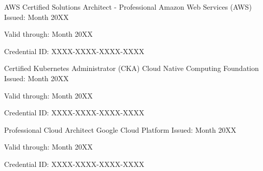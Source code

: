 
\begin{cventries}
    \cventry
    {AWS Certified Solutions Architect - Professional} %
    {Amazon Web Services (AWS)} %
    {Issued: Month 20XX} %
    {} %
    {
      \begin{cvitems} %
        \item {Valid through: Month 20XX}
        \item {Credential ID: XXXX-XXXX-XXXX-XXXX}
      \end{cvitems}
    }

    \cventry
    {Certified Kubernetes Administrator (CKA)} %
    {Cloud Native Computing Foundation} %
    {Issued: Month 20XX} %
    {} %
    {
      \begin{cvitems} %
        \item {Valid through: Month 20XX}
        \item {Credential ID: XXXX-XXXX-XXXX-XXXX}
      \end{cvitems}
    }

    \cventry
    {Professional Cloud Architect} %
    {Google Cloud Platform} %
    {Issued: Month 20XX} %
    {} %
    {
      \begin{cvitems} %
        \item {Valid through: Month 20XX}
        \item {Credential ID: XXXX-XXXX-XXXX-XXXX}
      \end{cvitems}
    }
\end{cventries}
